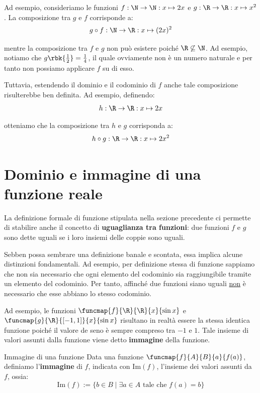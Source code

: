 \documentclass[a4paper, 12pt]{report}
\begin{document}
    Ad esempio, consideriamo le funzioni $f : \N \to \N : x \mapsto 2x$ e $g : \R \to \R : x \mapsto x^2$. La composizione tra $g$ e $f$ corrisponde a:
    \[g \circ f : \N \to \R : x \mapsto (2x)^2\]

    mentre la composizione tra $f$ e $g$ non può esistere poiché $\R \not\subseteq \N$. Ad esempio, notiamo che $g\rbk{\frac{1}{2}} = \frac{1}{4}$, il quale ovviamente non è un numero naturale e per tanto non possiamo applicare $f$ su di esso.

    Tuttavia, estendendo il dominio e il codominio di $f$ anche tale composizione risulterebbe ben definita. Ad esempio, definendo:
    \[h : \R \to \R : x \mapsto 2x\]
    
    otteniamo che la composizione tra $h$ e $g$ corrisponda a:
    \[h \circ g : \R \to \R : x \mapsto 2x^2\]

    \newpage

    \section{Dominio e immagine di una funzione reale}

    La definizione formale di funzione stipulata nella sezione precedente ci permette di stabilire anche il concetto di \textbf{uguaglianza tra funzioni}: due funzioni $f$ e $g$ sono dette uguali  se i loro insiemi delle coppie sono uguali.

    Sebben possa sembrare una definizione banale e scontata, essa implica alcune distinzioni fondamentali. Ad esempio, per definizione stessa di funzione sappiamo che non sia necessario che ogni elemento del codominio sia raggiungibile tramite un elemento del codominio. Per tanto, affinché due funzioni siano uguali \underline{non} è necessario che esse abbiano lo stesso codominio.

    Ad esempio, le funzioni $\funcmap{f}{\R}{\R}{x}{\sin x}$ e $\funcmap{g}{\R}{[-1,1]}{x}{\sin x}$ risultano in realtà essere la stessa identica funzione poiché il valore de seno è sempre compreso tra $-1$ e $1$. Tale insieme di valori assunti dalla funzione viene detto \textbf{immagine} della funzione.

    \begin{frameddefn}{Immagine di una funzione}
        Data una funzione $\funcmap{f}{A}{B}{a}{f(a)}$, definiamo l'\textbf{immagine} di $f$, indicata con $\mathrm{Im}(f)$, l'insieme dei valori assunti da $f$, ossia:
        \[\mathrm{Im}(f) := \{b \in B \mid \exists a \in A \text{ tale che } f(a) = b\}\]
    \end{frameddefn}
\end{document}
